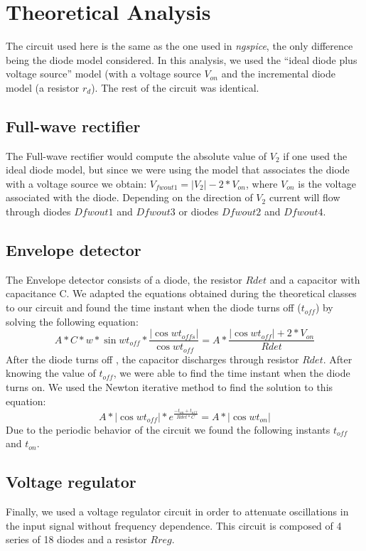 \section{Theoretical Analysis}
\label{sec:analysis}



The circuit used here is the same as the one used in \textit{ngspice}, the only difference being the diode model considered. In this analysis, we used the ``ideal diode plus voltage source'' model (with a voltage source $V_{on}$ and the incremental diode model (a resistor $r_d$). The rest of the circuit was identical.

\subsection{Full-wave rectifier}
The Full-wave rectifier would  compute the  absolute value of $V_2$ if one used the ideal diode model, but since we were using the model that associates the diode with a voltage source we obtain: $V_{fwout1} = |V_2|- 2*V_{on}$, where $V_{on}$ is the voltage associated with the diode. Depending on the direction of $V_2$ current will flow through diodes $Dfwout1$ and $Dfwout3$ or diodes $Dfwout2$ and $Dfwout4$.

\subsection{Envelope detector}
The Envelope detector consists of a diode, the resistor $Rdet$ and a capacitor with capacitance C. We adapted the equations obtained during the theoretical classes to our circuit and found the time instant when the diode turns off ($t_{off}$) by solving the following equation:
\begin{equation}
  A*C*w*\sin{wt_{off}}*\frac{|\cos{wt_{offs}}|}{\cos{wt_{off}}} =  A*\frac{|\cos{wt_{off}}|+2*V_{on}}{Rdet}
\end{equation}
After the diode turns off , the capacitor discharges through resistor $Rdet$.
After knowing the value of $t_{off}$, we were able to find the time instant when the diode turns on. We used the Newton iterative method to find the solution to this equation:
\begin{equation}
   A*|\cos{wt_{off}}|*e^{\frac{-t_{on}+t_{off}}{Rdet*C}}=  A*|\cos{wt_{on}}|
\end{equation}
Due to the periodic behavior of the circuit we found the following instants $t_{off}$ and $t_{on}$.  
\subsection{Voltage regulator}
Finally, we used a voltage regulator circuit in order to attenuate oscillations in the input signal without frequency dependence. This circuit is composed of 4 series of 18 diodes and a resistor $Rreg$.

